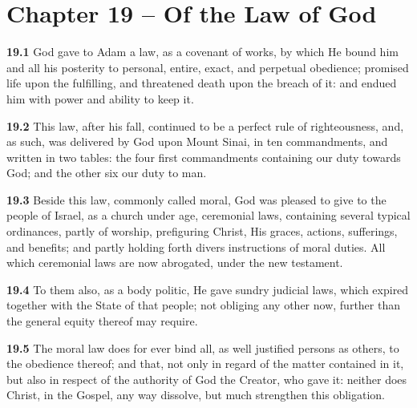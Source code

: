 \section{Chapter 19 -- Of the Law of God}

\par\textbf{19.1} God gave to Adam a law, as a covenant of works, by which He bound him and all his posterity to personal, entire, exact, and perpetual obedience; promised life upon the fulfilling, and threatened death upon the breach of it: and endued him with power and ability to keep it.   

\par\textbf{19.2} This law, after his fall, continued to be a perfect rule of righteousness, and, as such, was delivered by God upon Mount Sinai, in ten commandments, and written in two tables: the four first commandments containing our duty towards God; and the other six our duty to man.   

\par\textbf{19.3} Beside this law, commonly called moral, God was pleased to give to the people of Israel, as a church under age, ceremonial laws, containing several typical ordinances, partly of worship, prefiguring Christ, His graces, actions, sufferings, and benefits; and partly holding forth divers instructions of moral duties. All which ceremonial laws are now abrogated, under the new testament.   

\par\textbf{19.4} To them also, as a body politic, He gave sundry judicial laws, which expired together with the State of that people; not obliging any other now, further than the general equity thereof may require.   

\par\textbf{19.5} The moral law does for ever bind all, as well justified persons as others, to the obedience thereof; and that, not only in regard of the matter contained in it, but also in respect of the authority of God the Creator, who gave it: neither does Christ, in the Gospel, any way dissolve, but much strengthen this obligation.   

